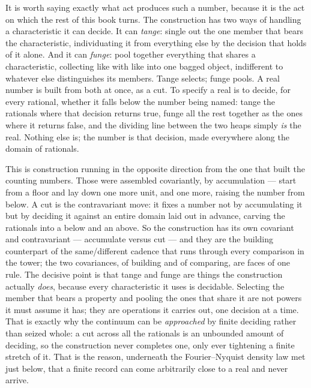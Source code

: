 It is worth saying exactly what act produces such a number, because it is the act on which the rest of
this book turns. The construction has two ways of handling a characteristic it can decide. It can
\emph{tange}: single out the one member that bears the characteristic, individuating it from everything
else by the decision that holds of it alone. And it can \emph{funge}: pool together everything that
shares a characteristic, collecting like with like into one bagged object, indifferent to whatever else
distinguishes its members. Tange selects; funge pools. A real number is built from both at once, as a
cut. To specify a real is to decide, for every rational, whether it falls below the number being named:
tange the rationals where that decision returns true, funge all the rest together as the ones where it
returns false, and the dividing line between the two heaps simply \emph{is} the real. Nothing else is;
the number is that decision, made everywhere along the domain of rationals.

This is construction running in the opposite direction from the one that built the counting numbers.
Those were assembled covariantly, by accumulation --- start from a floor and lay down one more unit,
and one more, raising the number from below. A cut is the contravariant move: it fixes a number not by
accumulating it but by deciding it against an entire domain laid out in advance, carving the rationals
into a below and an above. So the construction has its own covariant and contravariant --- accumulate
versus cut --- and they are the building counterpart of the same/different cadence that runs through
every comparison in the tower; the two covariances, of building and of comparing, are faces of one
rule. The decisive point is that tange and funge are things the construction actually \emph{does},
because every characteristic it uses is decidable. Selecting the member that bears a property and
pooling the ones that share it are not powers it must assume it has; they are operations it carries
out, one decision at a time. That is exactly why the continuum can be \emph{approached} by finite
deciding rather than seized whole: a cut across all the rationals is an unbounded amount of deciding,
so the construction never completes one, only ever tightening a finite stretch of it. That is the
reason, underneath the Fourier--Nyquist density law met just below, that a finite record can come
arbitrarily close to a real and never arrive.

